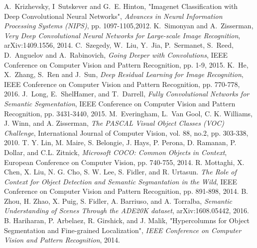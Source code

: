 \documentclass[a4paper,conference]{IEEEtran}
\begin{document}
%
%
%
\begin{thebibliography}{1}

A.~Krizhevsky, I~Sutskever and G.~E. Hinton, "Imagenet Classification with Deep Convolutional Neural Networks", \emph{Advances in Neural Information Processing Systems (NIPS)}, pp. 1097-1105,2012.
K.~Simonyan and A.~Zisserman, \emph{Very Deep Convolutional Neural Networks for Large-scale Image Recognition}, arXiv:1409.1556, 2014.
C.~Szegedy, W.~Liu, Y.~Jia, P.~Sermanet, S.~Reed, D.~Anguelov and A.~Rabinovich, \emph{Going Deeper with Convolutions}, IEEE Conference on Computer Vision and Pattern Recognition, pp. 1-9, 2015.
K.~He, X.~Zhang, S.~Ren and J.~Sun, \emph{Deep Residual Learning for Image Recognition}, IEEE Conference on Computer Vision and Pattern Recognition, pp. 770-778, 2016.
J.~Long, E.~ShelHamer, and T.~Darrell, \emph{Fully Convolutional Networks for Semantic Segmentation}, IEEE Conference on Computer Vision and Pattern Recognition, pp. 3431-3440, 2015.
M.~Everingham, L.~Van Gool, C. K. Williams, J. Winn, and A. Zisserman, \emph{The PASCAL Visual Object Classes (VOC) Challenge}, International Journal of Computer Vision, vol. 88, no.2, pp. 303-338, 2010.
T. Y. Lin, M. Maire, S. Belongie, J. Hays, P. Perona, D. Ramanan, P. Dollar, and C.L. Zitnick, \emph{Microsoft COCO: Common Objects in Context}, European Conference on Computer Vision, pp. 740-755, 2014.
R. Mottaghi, X. Chen, X. Liu, N. G. Cho, S. W. Lee, S. Fidler, and R. Urtasun. \emph{The Role of Context for Object Detection and Semantic Segmantation in the Wild}, IEEE Conference on Computer Vision and Pattern Recognition, pp. 891-898, 2014.
B. Zhou, H. Zhao, X. Puig, S. Fidler, A. Barriuso, and A. Torralba, \emph{Semantic Understanding of Scenes Through the ADE20K dataset}, arXiv:1608.05442, 2016.
B. Hariharan, P. Arbelaez, R. Girshick, and J. Malik, "Hypercolumns for Object Segmentation and Fine-grained Localization", \emph{IEEE Conference on Computer Vision and Pattern Recognition}, 2014.

\end{thebibliography}
\end{document}
